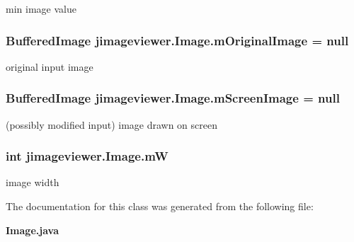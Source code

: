min image value 

\subsubsection{\setlength{\rightskip}{0pt plus 5cm}Buffered\-Image {\bf jimageviewer.Image.m\-Original\-Image} = null\hspace{0.3cm}{\tt  [package]}}\label{classjimageviewer_1_1_image_522d7c2339c07095939c1cb914708df7}


original input image 

\subsubsection{\setlength{\rightskip}{0pt plus 5cm}Buffered\-Image {\bf jimageviewer.Image.m\-Screen\-Image} = null\hspace{0.3cm}{\tt  [package]}}\label{classjimageviewer_1_1_image_582da672377e31d7a78158883aa6ba74}


(possibly modified input) image drawn on screen 

\subsubsection{\setlength{\rightskip}{0pt plus 5cm}int {\bf jimageviewer.Image.m\-W}\hspace{0.3cm}{\tt  [package]}}\label{classjimageviewer_1_1_image_55bd0e2cc47307caad7d2bf9104c96c6}


image width 



The documentation for this class was generated from the following file:\begin{CompactItemize}
\item 
{\bf Image.java}\end{CompactItemize}
